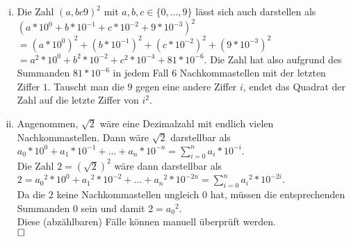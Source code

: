\documentclass[12pt,a4paper]{article}
\newcommand{\qed}{\null\nobreak\hfill\square}
\begin{document}
\begin{enumerate}[(i)]
    \item Die Zahl $(a,bc9)^2$ mit $a,b,c \in \{0,\dots, 9\}$ lässt sich auch darstellen als\\
    $(a * 10^0 + b * 10^{-1} + c * 10^{-2} + 9 * 10^{-3})^2$\\
    $= (a * 10^0)^2 + (b * 10^{-1})^2 + (c * 10^{-2})^2 + (9 * 10^{-3})^2$\\
    $= a^2 * 10^0 + b^2 * 10^{-2} + c^2 * 10^{-4} + 81 * 10^{-6}.$
    Die Zahl hat also aufgrund des Summanden $81 * 10^{-6}$ in jedem Fall $6$ Nachkommastellen mit der letzten Ziffer $1$.
    Tauscht man die $9$ gegen eine andere Ziffer $i$, endet das Quadrat der Zahl auf die letzte Ziffer von $i^2$.

    \item Angenommen, $\sqrt{2}$ wäre eine Dezimalzahl mit endlich vielen Nachkommastellen.
    Dann wäre $\sqrt{2}$ darstellbar als\\
    $a_0 * 10^0 + a_1 * 10^{-1} + \dots + a_n * 10^{-n} = \sum\limits_{i=0}^n a_i * 10^{-i}.$\\
    Die Zahl $2 = (\sqrt{2})^2$ wäre dann darstellbar als\\
    $2 = {a_0}^2 * 10^0 + {a_1}^2 * 10^{-2} + \dots + {a_n}^2 * 10^{-2n} = \sum\limits_{i=0}^n {a_i}^2 * 10^{-2i}.$\\
    Da die $2$ keine Nachkommastellen ungleich $0$ hat, müssen die entsprechenden Summanden $0$ sein und damit $2 = {a_0}^2$.\\
    Diese (abzählbaren) Fälle können manuell überprüft werden.\\
    $\qed$
\end{enumerate}


\end{document}
